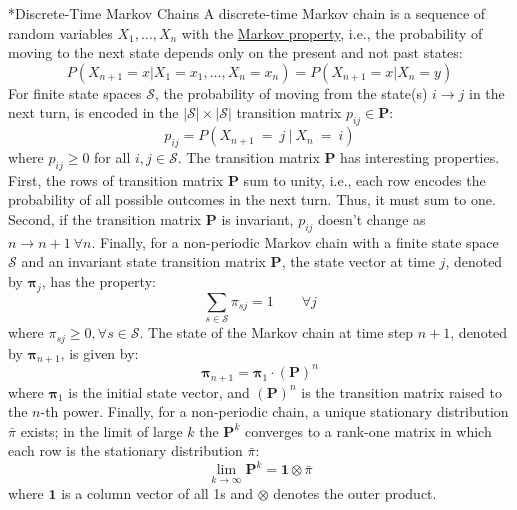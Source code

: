 \documentclass[11pt]{article}
\makeatletter
\theoremstyle{definition}
\renewcommand\subsubsection{\@startsection
	{subsubsection}{2}{0mm}
	{-0.05in}
	{-0.5\baselineskip}
	{\normalfont\normalsize\itshape\bfseries}}
\makeatother
\begin{document}
\subsubsection*{Discrete-Time Markov Chains}
A discrete-time Markov chain is a sequence of random variables $X_{1},\dotsc, X_{n}$ with 
the \href{https://en.wikipedia.org/wiki/Markov_property}{Markov property}, 
i.e., the probability of moving to the next state depends only on the present and not past states:
\begin{equation}
P(X_{n+1} = x | X_{1}=x_{1}, \dots, X_{n}=x_{n}) = P(X_{n+1} = x | X_{n}=y)
\end{equation}
For finite state spaces $\mathcal{S}$, the probability of moving from the state(s) $i\rightarrow{j}$ in the next turn, 
is encoded in the $|\mathcal{S}|\times|\mathcal{S}|$ transition matrix $p_{ij}\in\mathbf{P}$: 
\begin{equation}
p_{ij} = P(X_{n+1}~=~j~|~X_{n}~=~i)
\end{equation}
where $p_{ij}\geq{0}$ for all $i,j\in\mathcal{S}$. The transition matrix $\mathbf{P}$ has interesting properties. First, the rows of transition matrix $\mathbf{P}$ sum to unity, i.e., each row encodes the probability of all possible outcomes in the next turn.
Thus, it must sum to one. Second, if the transition matrix  $\mathbf{P}$ is invariant, $p_{ij}$ doesn't change as $n\rightarrow{n+1}~\forall{n}$.
Finally, for a non-periodic Markov chain with a finite state space $\mathcal{S}$ and an invariant state transition matrix $\mathbf{P}$,
the state vector at time $j$, denoted by $\mathbf{\pi}_{j}$, has the property:
\begin{equation}
\sum_{s\in\mathcal{S}}\pi_{sj} = 1\qquad\forall{j}
\end{equation}
where $\pi_{sj}\geq{0},\forall{s}\in\mathcal{S}$. The state of the Markov chain at time step $n+1$, denoted by $\mathbf{\pi}_{n+1}$, is given by:
\begin{equation}
\mathbf{\pi}_{n+1} = \mathbf{\pi}_{1}\cdot\left(\mathbf{P}\right)^n
\end{equation}
where $\mathbf{\pi}_{1}$ is the initial state vector, and $\left(\mathbf{P}\right)^n$ is the transition matrix raised to the $n$-th power.
Finally, for a non-periodic chain, a unique stationary distribution $\bar{\pi}$ exists; in the limit of large $k$ the $\mathbf{P}^{k}$ 
converges to a rank-one matrix in which each row is the stationary distribution $\bar{\pi}$:
\begin{equation}
\lim_{k\rightarrow\infty} \mathbf{P}^{k} = \mathbf{1}\otimes{\bar{\pi}}
\end{equation} 
where $\mathbf{1}$ is a column vector of all 1s and $\otimes$ denotes the outer product.
\end{document}
